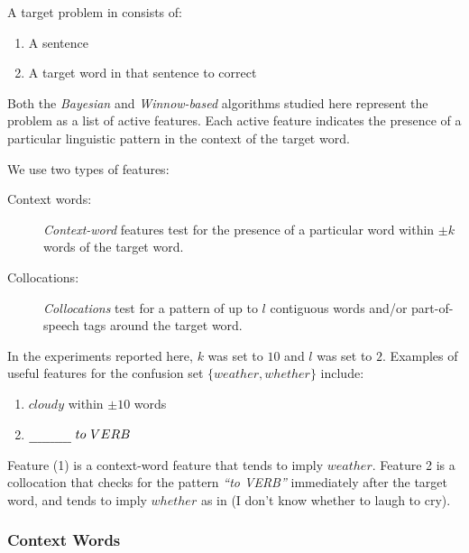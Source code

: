 

A target problem in \textit{\projectTitle{}} consists of:
\begin{enumerate}
    \item A sentence
    \item A target word in that sentence to correct
\end{enumerate}

Both the \textit{Bayesian} and \textit{Winnow-based} algorithms studied here
represent the problem as a list of active features. Each active feature
indicates the presence of a particular linguistic pattern in the context of the
target word.

We use two types of features:
\begin{description}
    \item [Context words:]
        \textit{Context-word} features test for the presence of a particular
        word within \(\pm k\) words of the target word.
    \item [Collocations:]
        \textit{Collocations} test for a pattern of up to \(l\) contiguous words
        and/or part-of-speech tags around the target word.
\end{description}

In the experiments reported here, \(k\) was set to \(10\) and \(l\) was set to
\(2\). Examples of useful features for the confusion set \(\{weather,
whether\}\) include:
\begin{enumerate}
    \item \(cloudy\) within \(\pm 10\) words
    \item \(\text{\ul{~~~~~~~~~~}\ } to \text{\ } VERB\)
\end{enumerate}

Feature (1) is a context-word feature that tends to imply \(weather\). Feature
2 is a collocation that checks for the pattern \textit{``to VERB''} immediately
after the target word, and tends to imply \(whether\) as in \ex(I don't know
whether to laugh to cry).

\subsubsection{Context Words}

